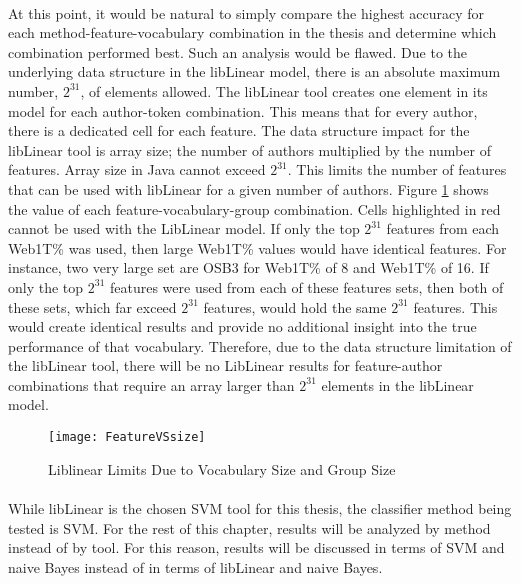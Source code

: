 	\paragraph*{} At this point, it would be natural to simply compare the highest accuracy for each method-feature-vocabulary combination in the thesis and determine which combination performed best.  Such an analysis would be flawed.  Due to the underlying data structure in the libLinear model, there is an absolute maximum number, $2^{31}$, of elements allowed.  The libLinear tool creates one element in its model for each author-token combination.  This means that for every author, there is a dedicated cell for each feature.  The data structure impact for the libLinear tool is array size; the number of authors multiplied by the number of features.  Array size in Java cannot exceed $2^{31}$. This limits the number of features that can be used with libLinear for a given number of authors. Figure \ref{fig:FeatureVSsize} shows the value of each feature-vocabulary-group combination.  Cells highlighted in red cannot be used with the LibLinear model.  If only the top $2^{31}$ features from each Web1T\% was used, then large Web1T\% values would have identical features.  For instance, two very large set are OSB3 for Web1T\% of 8 and Web1T\% of 16.  If only the top $2^{31}$ features were used from each of these features sets, then both of these sets, which far exceed $2^{31}$ features, would hold the same $2^{31}$ features.  This would create identical results and provide no additional insight into the true performance of that vocabulary. Therefore, due to the data structure limitation of the libLinear tool, there will be no LibLinear results for feature-author combinations that require an array larger than $2^{31}$ elements in the libLinear model.  
	

\begin{figure}[htbp!]
	\begin{center}
	\centering
	\texttt{[image: FeatureVSsize]}
	\caption{Liblinear Limits Due to Vocabulary Size and Group Size}
	\label{fig:FeatureVSsize}
	\end{center}
\end{figure}


	\paragraph*{}  While libLinear is the chosen SVM tool for this thesis, the classifier method being tested is SVM.  For the rest of this chapter, results will be analyzed by method instead of by tool.  For this reason, results will be discussed in terms of SVM and naive Bayes instead of in terms of libLinear and naive Bayes.

